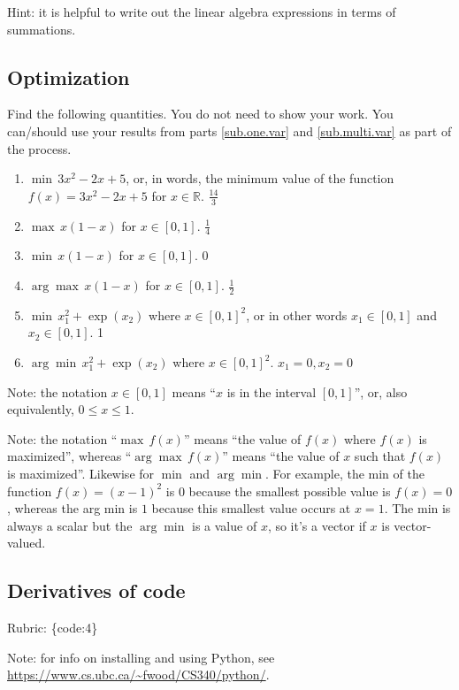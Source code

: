\documentclass{article}
\def\rubric#1{\gre{Rubric: \{#1\}}}{}
\def\blu#1{{\color{blu}#1}}
\def\gre#1{{\color{gre}#1}}
\def\red#1{{\color{red}#1}}
\def\R{\mathbb{R}}
\begin{document}
Hint: it is helpful to write out the linear algebra expressions in terms of summations.


\subsection{Optimization}
\blu{Find the following quantities.} You do not need to show your work. 
You can/should use your results from parts \ref{sub.one.var} and \ref{sub.multi.var} as part of the process.

\begin{enumerate}
\item $\min \, 3x^2-2x+5$, or, in words, the minimum value of the function $f(x) = 3x^2 -2x + 5$ for $x \in \R$. \red{$\frac{14}{3}$}
\item $\max \, x(1-x)$ for $x\in [0,1]$. \red{$\frac{1}{4}$}
\item $\min \, x(1-x)$ for $x\in [0,1]$. \red{0}
\item $\arg \max \, x(1-x)$ for $x\in[0,1]$. \red{$\frac{1}{2}$}
\item $\min \, x_1^2 + \exp(x_2)$ where $x \in [0,1]^2$, or in other words $x_1\in [0,1]$ and $x_2\in [0,1]$. \red{1}
\item $\arg \min \, x_1^2 + \exp(x_2)$ where $x \in [0,1]^2$.  \red{$x_1 = 0, x_2 = 0$}
\end{enumerate}

Note: the notation $x\in [0,1]$ means ``$x$ is in the interval $[0,1]$'', or, also equivalently, $0 \leq x \leq 1$.

Note: the notation ``$\max \, f(x)$'' means ``the value of $f(x)$ where $f(x)$ is maximized'', whereas ``$\arg \max \, f(x)$'' means ``the value of $x$ such that $f(x)$ is maximized''.
Likewise for $\min$ and $\arg \min$. For example, the min of the function $f(x)=(x-1)^2$ is $0$ because the smallest possible value is $f(x)=0$, 
whereas the arg min is $1$ because this smallest value occurs at $x=1$. The min is always a scalar but the $\arg \min$ is a value of $x$, so it's a vector 
if $x$ is vector-valued.

\subsection{Derivatives of code}

\rubric{code:4}

Note: for info on installing and using Python, see \\\url{https://www.cs.ubc.ca/~fwood/CS340/python/}.
\end{document}
